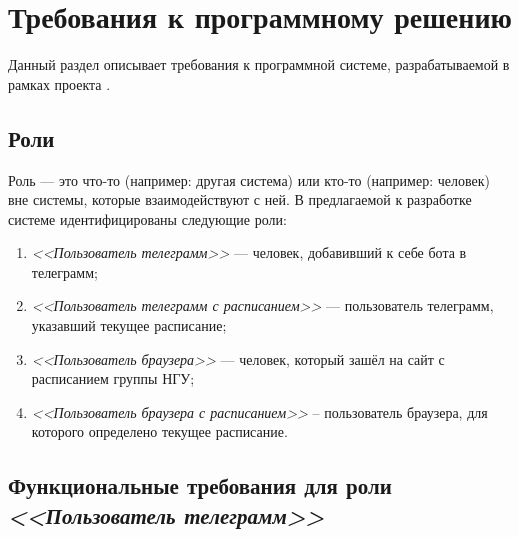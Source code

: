 \newcommand{\actor}[1]{\textit{<<#1>>}}

\chapter{Требования к программному решению}
	\label{chapter3}

	Данный раздел описывает требования к программной системе, разрабатываемой в рамках проекта \ProjectName.
		
	\section{Роли}
		Роль --- это что-то (например: другая система) или кто-то (например: человек) вне системы, которые взаимодействуют с ней. В предлагаемой к разработке системе идентифицированы следующие роли:
		\begin{enumerate}
			\item \actor{Пользователь телеграмм} --- человек, добавивший к себе бота в телеграмм;
			
			\item \actor{Пользователь телеграмм с расписанием} --- пользователь телеграмм, указавший текущее расписание;
			
			\item \actor{Пользователь браузера} --- человек, который зашёл на сайт с расписанием группы НГУ;
			
			\item \actor{Пользователь браузера с расписанием} -- пользователь браузера, для которого определено текущее расписание.
		\end{enumerate}
	
	    \begin{figure}[h!]
	    	\centering
	    	\def\svgwidth{\columnwidth}
	    	
	    \end{figure}
	
		\begin{figure}[h!]
			\centering
			\def\svgwidth{\columnwidth}
			
		\end{figure}
	\section{Функциональные требования для роли \actor{Пользователь телеграмм}}
